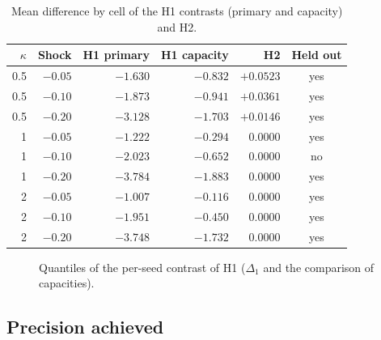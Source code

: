 \begin{table}[htbp]
\centering
\caption{Mean difference by cell of the H1 contrasts (primary and capacity) and H2.}
\label{tab:celdas}
\small
\begin{tabular}{@{}rrrrrc@{}}
\toprule
$\kappa$ & Shock & H1 primary & H1 capacity & H2 & Held out \\
\midrule
0.5 & $-0.05$ & $-1.630$ & $-0.832$ & $+0.0523$ & yes \\
0.5 & $-0.10$ & $-1.873$ & $-0.941$ & $+0.0361$ & yes \\
0.5 & $-0.20$ & $-3.128$ & $-1.703$ & $+0.0146$ & yes \\
1 & $-0.05$ & $-1.222$ & $-0.294$ & $0.0000$ & yes \\
1 & $-0.10$ & $-2.023$ & $-0.652$ & $0.0000$ & no \\
1 & $-0.20$ & $-3.784$ & $-1.883$ & $0.0000$ & yes \\
2 & $-0.05$ & $-1.007$ & $-0.116$ & $0.0000$ & yes \\
2 & $-0.10$ & $-1.951$ & $-0.450$ & $0.0000$ & yes \\
2 & $-0.20$ & $-3.748$ & $-1.732$ & $0.0000$ & yes \\
\bottomrule
\end{tabular}
\end{table}

\begin{figure}[htbp]
\centering
{}
\caption{Quantiles of the per-seed contrast of H1 ($\Delta_1$ and the comparison of capacities).}
\label{fig:cuantiles}
\end{figure}

\subsection{Precision achieved}

